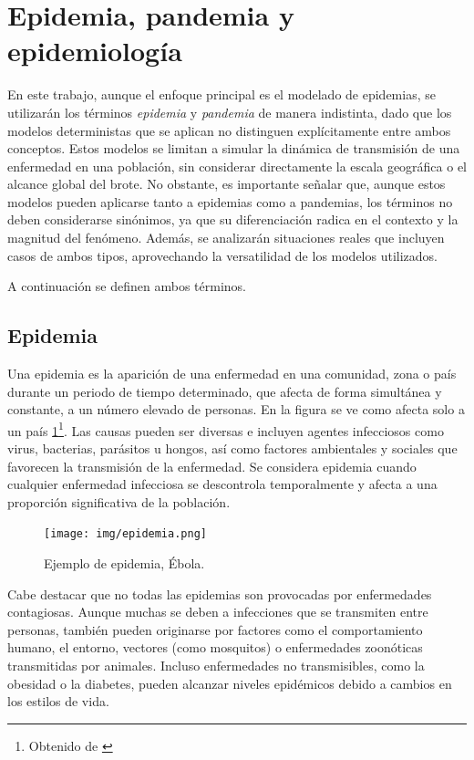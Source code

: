 \setcounter{secnumdepth}{3}

\section{Epidemia, pandemia y epidemiología}
En este trabajo, aunque el enfoque principal es el modelado de epidemias, se utilizarán los términos \textit{epidemia} y \textit{pandemia} de manera indistinta, dado que los modelos deterministas que se aplican no distinguen explícitamente entre ambos conceptos. Estos modelos se limitan a simular la dinámica de transmisión de una enfermedad en una población, sin considerar directamente la escala geográfica o el alcance global del brote.
No obstante, es importante señalar que, aunque estos modelos  pueden aplicarse tanto a epidemias como a pandemias, los términos no deben considerarse sinónimos, ya que su diferenciación radica en el contexto y la magnitud del fenómeno. Además, se analizarán situaciones reales que incluyen casos de ambos tipos, aprovechando la versatilidad de los modelos utilizados.

A continuación se definen ambos términos.

\subsection{Epidemia}
Una epidemia es la aparición de una enfermedad en una comunidad, zona o país durante un periodo de tiempo determinado, que afecta de forma simultánea y constante, a un número elevado de personas. En la figura se ve como afecta solo a un país  \ref{fig:epidemia}\footnote{Obtenido de \cite{bbc_ebola_2014}}. Las causas pueden ser diversas e incluyen agentes infecciosos como virus, bacterias, parásitos u hongos, así como factores ambientales y sociales que favorecen la transmisión de la enfermedad. Se considera epidemia cuando cualquier enfermedad infecciosa se descontrola temporalmente y afecta a una proporción significativa de la población.

\begin{figure}[H]
    \centering
    \texttt{[image: img/epidemia.png]}
    \caption{Ejemplo de epidemia, Ébola.}
    \label{fig:epidemia}
\end{figure}


Cabe destacar que no todas las epidemias son provocadas por enfermedades contagiosas. Aunque muchas se deben a infecciones que se transmiten entre personas, también pueden originarse por factores como el comportamiento humano, el entorno, vectores (como mosquitos) o enfermedades zoonóticas transmitidas por animales. Incluso enfermedades no transmisibles, como la obesidad o la diabetes, pueden alcanzar niveles epidémicos debido a cambios en los estilos de vida.


